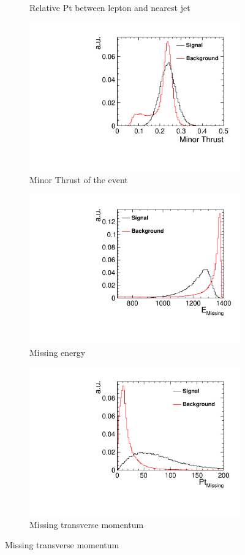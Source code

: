 \begin{figure}[]
\begin{subfigure}[]{0.5\linewidth}
    \caption{Relative Pt between lepton and nearest jet} 
    \vspace{4ex}
  \end{subfigure}%
  \begin{subfigure}[]{0.5\linewidth}
    \centering
    \includegraphics[width=0.75\linewidth]{Appendix/figures/MinorThrust} 
    \caption{Minor Thrust of the event} 
    \vspace{4ex}
  \end{subfigure} 
  \begin{subfigure}[]{0.5\linewidth}
    \centering
    \includegraphics[width=0.75\linewidth]{Appendix/figures/MissingE} 
    \caption{Missing energy} 
    \vspace{4ex}
  \end{subfigure}%
  \begin{subfigure}[]{0.5\linewidth}
    \centering
    \includegraphics[width=0.75\linewidth]{Appendix/figures/MissingPt} 
    \caption{Missing transverse momentum} 
    \vspace{4ex}
  \end{subfigure}
\end{figure}

